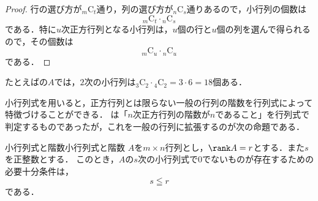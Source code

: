 \begin{tleftbar}
\begin{proof}
  行の選び方が${}_m \mathrm{C}_t$通り，列の選び方が${}_n \mathrm{C}_s$通りあるので，小行列の個数は
  \[
  {}_m \mathrm{C}_t \cdot {}_n \mathrm{C}_s
  \]
  である．特に$u$次正方行列となる小行列は，$u$個の行と$u$個の列を選んで得られるので，その個数は
  \[
  {}_m \mathrm{C}_u \cdot {}_n \mathrm{C}_u
  \]
  である．
\end{proof}
\end{tleftbar}

たとえばの$A$では，$2$次の小行列は${}_3\mathrm{C}_2 \cdot {}_4\mathrm{C}_2 = 3 \cdot 6 = 18$個ある．

小行列式を用いると，正方行列とは限らない一般の行列の階数を行列式によって特徴づけることができる．
は「$n$次正方行列の階数が$n$であること」を行列式で判定するものであったが，これを一般の行列に拡張するのが次の命題である．

\begin{prop}{小行列式と階数}{小行列式と階数}
  $A$を$m \times n$行列とし，$\rank A = r$とする．また$s$を正整数とする．
  このとき，$A$の$s$次の小行列式で$0$でないものが存在するための必要十分条件は，
  \[
  s \leqq r
  \]
  である．
\end{prop}

